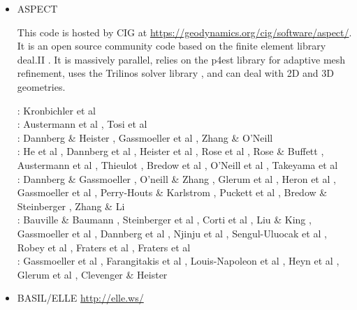 \begin{itemize}
\item {\codefont ASPECT} 

This code is hosted by CIG at \url{https://geodynamics.org/cig/software/aspect/}. 
It is an open source community code based on the finite element library deal.II \cite{bahk07,arbc19,arbd20}. 
It is massively parallel, relies on the p4est library for adaptive mesh refinement,
uses the Trilinos solver library \cite{hewi12}, and can deal with 2D and 3D geometries. 

\noindent
{\small
\twothousandtwelve:
Kronbichler et al \cite{krhb12}\\
\twothousandfifteen:
Austermann et al \cite{aupm15}, Tosi et al \cite{tosn15}\\
\twothousandsixteen:
Dannberg \& Heister \cite{dahe16}, Gassmoeller et al \cite{gadb16}, Zhang \& O'Neill \cite{zhon16}\\
\twothousandseventeen:
He et al \cite{hepb17}, Dannberg et al \cite{daef17}, Heister et al \cite{hedg17},
Rose et al \cite{robh17}, Rose \& Buffett \cite{robu17}, Austermann et al \cite{aumh17},
Thieulot \cite{thie17}, Bredow et al \cite{brsg17}, O'Neill et al \cite{onmz17},
Takeyama et al \cite{tasm17}\\
\twothousandeighteen:
Dannberg \& Gassmoeller \cite{daga18}, O'neill \& Zhang \cite{onzh18}, 
Glerum et al \cite{gltf18}, Heron et al \cite{heps18}, Gassmoeller et al \cite{galh18}, 
Perry-Houts \& Karlstrom \cite{peka18}, Puckett et al \cite{puth18},
Bredow \& Steinberger \cite{brst18b}, Zhang \& Li \cite{zhli18}\\
\twothousandnineteen:
Bauville \& Baumann \cite{baba19}, Steinberger et al \cite{stbl19}, Corti et al \cite{cocf19},
Liu \& King \cite{liki19}, Gassmoeller et al \cite{galb19}, Dannberg et al \cite{dagg19},
Njinju et al \cite{njas19}, Sengul-Uluocak et al \cite{sepg19}, Robey et al \cite{ropu19},
Fraters et al \cite{frtv19}, Fraters et al \cite{frbt19}\\
\twothousandtwenty:
Gassmoeller et al \cite{gadb20}, Farangitakis et al \cite{fahm20}, 
Louis-Napoleon et al \cite{logb20}, Heyn et al \cite{hect20}, Glerum et al \cite{glbs20},
Clevenger \& Heister \cite{clhe20}
}

\item {\codefont BASIL/ELLE} \url{http://elle.ws/}


\end{itemize}
